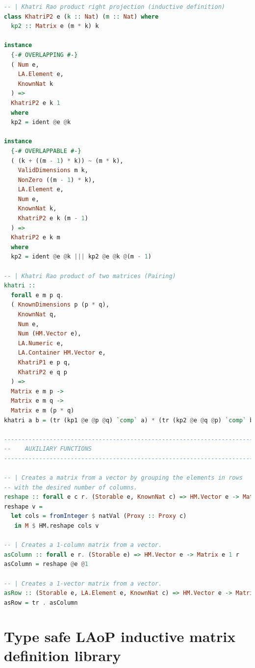 \documentclass[
  oneside,
  11pt, a4paper,
  footinclude=true,
  headinclude=true,
  cleardoublepage=empty
]{scrbook}
\theoremstyle{definition}
\theoremstyle{definition}
\begin{document}
\begin{lstlisting}[language=Haskell, caption={Matrix.Internal},captionpos=b]
-- | Khatri Rao product right projection (inductive definition)
class KhatriP2 e (k :: Nat) (m :: Nat) where
  kp2 :: Matrix e (m * k) k

instance
  {-# OVERLAPPING #-}
  ( Num e,
    LA.Element e,
    KnownNat k
  ) =>
  KhatriP2 e k 1
  where
  kp2 = ident @e @k

instance
  {-# OVERLAPPABLE #-}
  ( (k + ((m - 1) * k)) ~ (m * k),
    ValidDimensions m k,
    NonZero ((m - 1) * k),
    LA.Element e,
    Num e,
    KnownNat k,
    KhatriP2 e k (m - 1)
  ) =>
  KhatriP2 e k m
  where
  kp2 = ident @e @k ||| kp2 @e @k @(m - 1)

-- | Khatri Rao product of two matrices (Pairing)
khatri ::
  forall e m p q.
  ( KnownDimensions p (p * q),
    KnownNat q,
    Num e,
    Num (HM.Vector e),
    LA.Numeric e,
    LA.Container HM.Vector e,
    KhatriP1 e p q,
    KhatriP2 e q p
  ) =>
  Matrix e m p ->
  Matrix e m q ->
  Matrix e m (p * q)
khatri a b = (tr (kp1 @e @p @q) `comp` a) * (tr (kp2 @e @q @p) `comp` b)

-------------------------------------------------------------------------------
--    AUXILIARY FUNCTIONS
-------------------------------------------------------------------------------

-- | Creates a matrix from a vector by grouping the elements in rows
-- with the desired number of columns.
reshape :: forall e c r. (Storable e, KnownNat c) => HM.Vector e -> Matrix e c r
reshape v =
  let cols = fromInteger $ natVal (Proxy :: Proxy c)
   in M $ HM.reshape cols v

-- | Creates a 1-column matrix from a vector.
asColumn :: forall e r. (Storable e) => HM.Vector e -> Matrix e 1 r
asColumn = reshape @e @1

-- | Creates a 1-vector matrix from a vector.
asRow :: (Storable e, LA.Element e, KnownNat c) => HM.Vector e -> Matrix e c 1
asRow = tr . asColumn
    \end{lstlisting}
    
	\chapter{Type safe LAoP inductive matrix definition library}\label{appendix-b}
	
\end{document}
